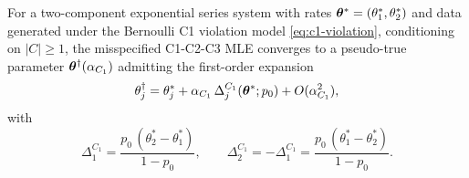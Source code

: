 \begin{theorem}[Pseudo-True Parameter Under C1 Misspecification, $m=2$]
\label{thm:misspec-C1}
For a two-component exponential series system with rates
$\bm{\theta}^* = (\theta_1^*, \theta_2^*)$ and data generated under the
Bernoulli C1 violation model \eqref{eq:c1-violation}, conditioning on
$|C| \geq 1$, the misspecified C1-C2-C3 MLE converges to a pseudo-true
parameter $\bm{\theta}^\dagger(\alpha_{C_1})$ admitting the first-order
expansion
\begin{equation}
\label{eq:c1-expansion}
    \theta_j^\dagger = \theta_j^* +
        \alpha_{C_1}\, \Delta_j^{C_1}(\bm{\theta}^*; p_0) +
        O(\alpha_{C_1}^2),
\end{equation}
with
\begin{equation}
\label{eq:c1-delta}
    \Delta_1^{C_1} = \frac{p_0\,(\theta_2^* - \theta_1^*)}{1 - p_0},
    \qquad
    \Delta_2^{C_1} = -\Delta_1^{C_1} =
        \frac{p_0\,(\theta_1^* - \theta_2^*)}{1 - p_0}.
\end{equation}
\end{theorem}

